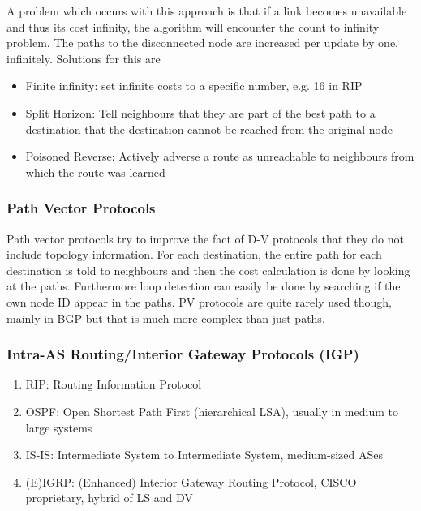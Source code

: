 A problem which occurs with this approach is that if a link becomes unavailable and thus its cost infinity, the algorithm will encounter the count to infinity problem.
The paths to the disconnected node are increased per update by one, infinitely.
Solutions for this are
\begin{itemize}
  \item Finite infinity: set infinite costs to a specific number, e.g. 16 in RIP
  \item Split Horizon: Tell neighbours that they are part of the best path to a destination that the destination cannot be reached from the original node
  \item Poisoned Reverse: Actively adverse a route as unreachable to neighbours from which the route was learned
\end{itemize}

\subsubsection*{Path Vector Protocols}
Path vector protocols try to improve the fact of D-V protocols that they do not include topology information.
For each destination, the entire path for each destination is told to neighbours and then the cost calculation is done by looking at the paths.
Furthermore loop detection can easily be done by searching if the own node ID appear in the paths.
PV protocols are quite rarely used though, mainly in BGP but that is much more complex than just paths.

\subsubsection*{Intra-AS Routing/Interior Gateway Protocols (IGP)}
\begin{enumerate}
  \item RIP: Routing Information Protocol
  \item OSPF: Open Shortest Path First (hierarchical LSA), usually in medium to large systems
  \item IS-IS: Intermediate System to Intermediate System, medium-sized ASes
  \item (E)IGRP: (Enhanced) Interior Gateway Routing Protocol, CISCO proprietary, hybrid of LS and DV
\end{enumerate}
\vspace{5pt}

